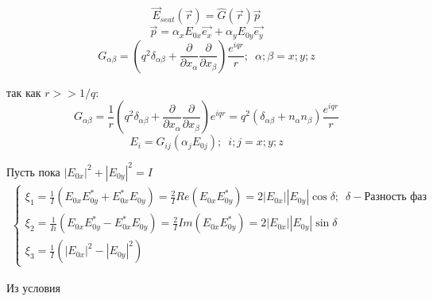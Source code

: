 \documentclass[12pt]{article}
\begin{document}
\begin{large}
\[
    \overrightarrow{E}_{seat} \left( \vec{r} \right) = \widehat{G} \left( \vec{r} \right) \vec{p}
\]
\[
    \vec{p} = \alpha_x E_{0x} \vec{e_x} + \alpha_y E_{0y} \vec{e_y}
\]
\[
    G_{\alpha \beta } = \left( q^2 \delta_{\alpha \beta} + \frac{\partial }{\partial x_\alpha}\frac{\partial }{\partial x_\beta} \right) \frac{e^{iqr}}{r} ;  \, \, \, \alpha; \beta = x; y; z
\]
\par так как $r >> 1/q$:
\[
    G_{\alpha \beta } = \frac{1}{r} \left( q^2 \delta_{\alpha \beta} + \frac{\partial }{\partial x_\alpha}\frac{\partial }{\partial x_\beta} \right)e^{iqr} = q^2 \left( \delta_{\alpha \beta} + n_\alpha n_\beta \right) \frac{e^{iqr}}{r}
\]
\[
    E_i = G_{ij}\left( \alpha_j E_{0j} \right) ;  \, \, \, i; j = x; y; z
\]
\par Пусть пока $|E_{0x}|^2 + |E_{0y}|^2 = I$
\begin{eqnarray*}
    \begin{cases}
        \xi_1 = \frac{1}{I}\left( E_{0x}E_{0y}^* + E_{0x}^*E_{0y} \right) = \frac{2}{I} Re\left( E_{0x}E_{0y}^* \right) = 2|E_{0x}||E_{0y}| \cos \delta ; \,\,\, \delta - \text{Разность фаз} \\
        \xi_2 = \frac{1}{I i}\left( E_{0x}E_{0y}^* - E_{0x}^*E_{0y} \right) = \frac{2}{I} Im\left( E_{0x}E_{0y}^* \right) = 2|E_{0x}||E_{0y}| \sin \delta \\
        \xi_3 = \frac{1}{I} \left( |E_{0x}|^2 - |E_{0y}|^2 \right)
    \end{cases}
\end{eqnarray*}
\par Из условия
\begin{eqnarray*}

\end{eqnarray*}
\end{large}
\end{document}
